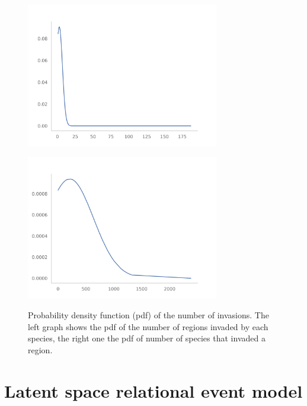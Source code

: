\documentclass[mscthesis]{usiinfthesis}
\begin{document}
\begin{figure}
\centering
\begin{minipage}{.5\textwidth}
  \centering
    \includegraphics[width=0.75\textwidth]{species_region_invasion.png}
    \label{fig:pdf_invasion_filtered}
\end{minipage}%
\begin{minipage}{.5\textwidth}
  \centering
    \includegraphics[width=0.75\textwidth]{region_species_invasion.png}
    \label{fig:pdf_invasion_filtered}
\end{minipage}
\caption{Probability density function (pdf) of the number of invasions. The left graph shows the pdf of the number of regions invaded by each species, the right one the pdf of number of species that invaded a region.}
\end{figure}


\section{Latent space relational event model}
\end{document}
